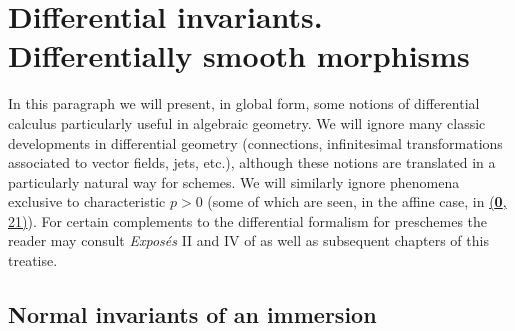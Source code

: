 \setcounter{section}{15}
\section{Differential invariants. Differentially smooth morphisms}
\label{section:IV.16}

In this paragraph we will present, in global form, some notions of differential calculus particularly useful in algebraic geometry.
We will ignore many classic developments in differential geometry (connections, infinitesimal transformations associated to vector fields, jets, etc.), although these notions are translated in a particularly natural way for schemes.
We will similarly ignore phenomena exclusive to characteristic $p>0$ (some of which are seen, in the affine case, in \hyperref[section:0.21]{(\textbf{0}, 21)}).
For certain complements to the differential formalism for preschemes the reader may consult \emph{Expos\'es} II and IV of \cite{SGA3} as well as subsequent chapters of this treatise. 


\subsection{Normal invariants of an immersion}
\label{IV.16.1}

\begin{env}[16.1.1]
\label{IV.16.1.1}
\end{env}
